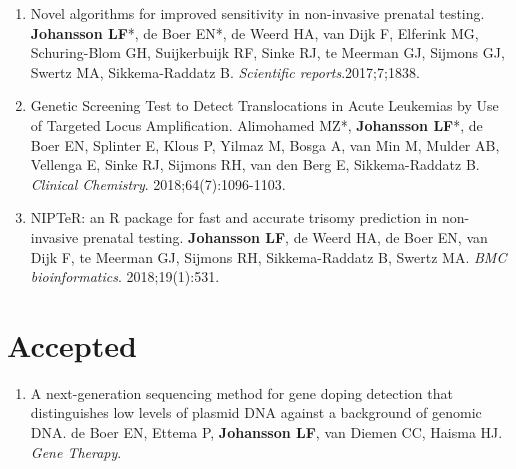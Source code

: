\begin{appendices}
\begin{enumerate}
	\item Novel algorithms for improved sensitivity in non-invasive prenatal testing. \textbf{Johansson LF}*, de Boer EN*, de Weerd HA, van Dijk F, Elferink MG, Schuring-Blom GH, Suijkerbuijk RF, Sinke RJ, te Meerman GJ, Sijmons GJ, Swertz MA, Sikkema-Raddatz B. \textsl{Scientific reports}.2017;7;1838.
	\item Genetic Screening Test to Detect Translocations in Acute Leukemias by Use of Targeted Locus Amplification. Alimohamed MZ*, \textbf{Johansson LF}*, de Boer EN, Splinter E, Klous P, Yilmaz M, Bosga A, van Min M, Mulder AB, Vellenga E, Sinke RJ, Sijmons RH, van den Berg E, Sikkema-Raddatz B. \textsl{Clinical Chemistry}. 2018;64(7):1096-1103.
	\item NIPTeR: an R package for fast and accurate trisomy prediction in non-invasive prenatal testing. \textbf{Johansson LF}, de Weerd HA, de Boer EN, van Dijk F, te Meerman GJ, Sijmons RH, Sikkema-Raddatz B, Swertz MA. \textsl{BMC bioinformatics}. 2018;19(1):531.
	\end{enumerate}
	
	\section*{Accepted}
	\begin{enumerate}
		\item A next-generation sequencing method for gene doping detection that distinguishes low levels of plasmid DNA against a background of genomic DNA. de Boer EN, Ettema P, \textbf{Johansson LF}, van Diemen CC, Haisma HJ. \textsl{Gene Therapy}.
	\end{enumerate}
	

\end{appendices}
